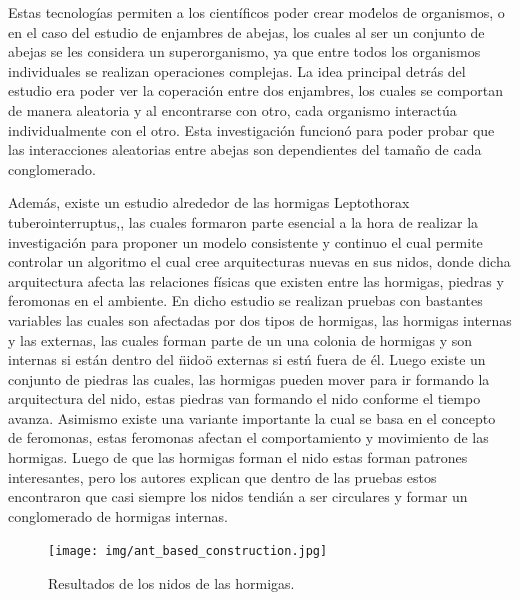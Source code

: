 \documentclass[conference]{IEEEtran}
\begin{document}
Estas tecnolog\'ias permiten a los cient\'ificos poder crear mo\'delos de organismos, o en el caso del estudio de enjambres de abejas, los cuales al ser un conjunto de abejas se les considera un superorganismo, ya que entre todos los organismos individuales se realizan operaciones complejas.\cite{TMRT01} La idea principal detr\'as del estudio era poder ver la coperaci\'on entre dos enjambres, los cuales se comportan de manera aleatoria y al encontrarse con otro, cada organismo interact\'ua individualmente con el otro. Esta investigaci\'on funcion\'o para poder probar que las interacciones aleatorias entre abejas son dependientes del tama\~no de cada conglomerado.  

Adem\'as, existe un estudio alrededor de las hormigas  Leptothorax tuberointerruptus,\cite{LP01}, las cuales formaron parte esencial a la hora de realizar la investigaci\'on para proponer un modelo consistente y continuo el cual permite controlar un algoritmo el cual cree arquitecturas nuevas en sus nidos, donde dicha arquitectura afecta las relaciones f\'isicas que existen entre las hormigas, piedras y feromonas en el ambiente.
En dicho estudio se realizan pruebas con bastantes variables las cuales son afectadas por dos tipos de hormigas, las hormigas internas y las externas, las cuales forman parte de un una colonia de hormigas y son internas si est\'an dentro del \"nido\" o externas si est\'n fuera de \'el. Luego existe un conjunto de piedras las cuales, las hormigas pueden mover para ir formando la arquitectura del nido, estas piedras van formando el nido conforme el tiempo avanza. Asimismo existe una variante importante la cual se basa en el concepto de feromonas, estas feromonas afectan el comportamiento y movimiento de las hormigas.\cite{LP01}
Luego de que las hormigas forman el nido estas forman patrones interesantes, pero los autores explican que dentro de las pruebas estos encontraron que casi siempre los nidos tendi\'an a ser circulares y formar un conglomerado de hormigas internas. 

\begin{figure}[ht]
  \texttt{[image: img/ant\_based\_construction.jpg]}
  \caption{Resultados de los nidos de las hormigas. \cite{LP01}}
  \label{fig:ant_based_construction}
\end{figure}
\end{document}
